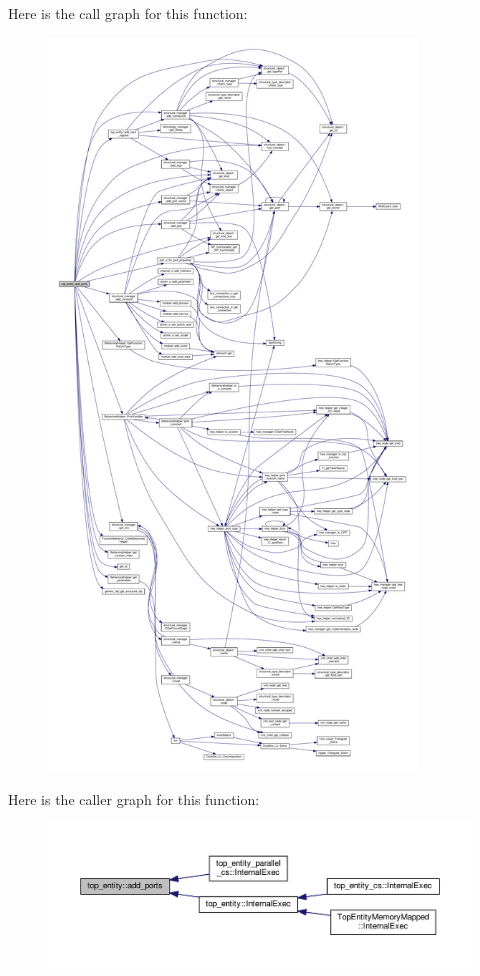 Here is the call graph for this function\+:
\nopagebreak
\begin{figure}[H]
\begin{center}
\leavevmode
\includegraphics[height=550pt]{d0/d0e/classtop__entity_ad63b0b997f3905f591e00e26d07f5b86_cgraph}
\end{center}
\end{figure}
Here is the caller graph for this function\+:
\nopagebreak
\begin{figure}[H]
\begin{center}
\leavevmode
\includegraphics[width=350pt]{d0/d0e/classtop__entity_ad63b0b997f3905f591e00e26d07f5b86_icgraph}
\end{center}
\end{figure}
\mbox{\label{classtop__entity_a414a49e2195ed1b077e625a546f64427}} 
